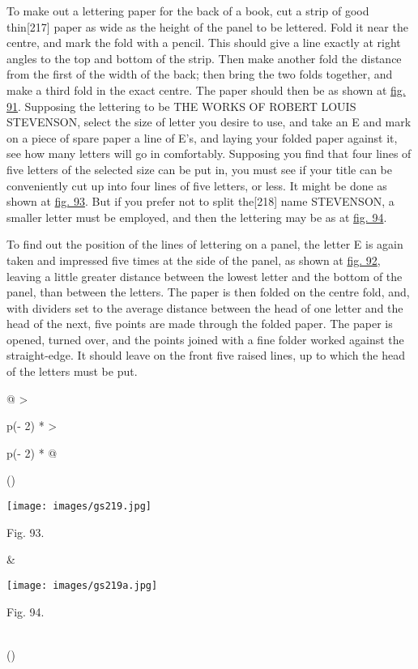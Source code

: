 \documentclass[
]{article}
\begin{document}
To make out a lettering paper for the back of a book, cut a strip of
good thin{\protect\hypertarget{Page_217}{}{{[}217{]}}} paper as wide as
the height of the panel to be lettered. Fold it near the centre, and
mark the fold with a pencil. This should give a line exactly at right
angles to the top and bottom of the strip. Then make another fold the
distance from the first of the width of the back; then bring the two
folds together, and make a third fold in the exact centre. The paper
should then be as shown at \protect\hyperlink{Fig_91}{fig. 91}.
Supposing the lettering to be THE WORKS OF ROBERT LOUIS STEVENSON,
select the size of letter you desire to use, and take an E and mark on a
piece of spare paper a line of E's, and laying your folded paper against
it, see how many letters will go in comfortably. Supposing you find that
four lines of five letters of the selected size can be put in, you must
see if your title can be conveniently cut up into four lines of five
letters, or less. It might be done as shown at
\protect\hyperlink{Fig_93}{fig. 93}. But if you prefer not to split
the{\protect\hypertarget{Page_218}{}{{[}218{]}}} name STEVENSON, a
smaller letter must be employed, and then the lettering may be as at
\protect\hyperlink{Fig_94}{fig. 94}.

To find out the position of the lines of lettering on a panel, the
letter E is again taken and impressed five times at the side of the
panel, as shown at \protect\hyperlink{Fig_92}{fig. 92}, leaving a little
greater distance between the lowest letter and the bottom of the panel,
than between the letters. The paper is then folded on the centre fold,
and, with dividers set to the average distance between the head of one
letter and the head of the next, five points are made through the folded
paper. The paper is opened, turned over, and the points joined with a
fine folder worked against the straight-edge. It should leave on the
front five raised lines, up to which the head of the letters must be
put.

\begin{longtable}[]{@{}
  >{\raggedright\arraybackslash}p{(\columnwidth - 2\tabcolsep) * }
  >{\raggedright\arraybackslash}p{(\columnwidth - 2\tabcolsep) * }@{}}
\toprule()
\endhead
\begin{minipage}[t]{\linewidth}\raggedright
\protect\hypertarget{Fig_93}{}{}
\texttt{[image: images/gs219.jpg]}

Fig. 93.
\end{minipage} & \begin{minipage}[t]{\linewidth}\raggedright
\protect\hypertarget{Fig_94}{}{}
\texttt{[image: images/gs219a.jpg]}

Fig. 94.
\end{minipage} \\
\bottomrule()
\end{longtable}
\end{document}
